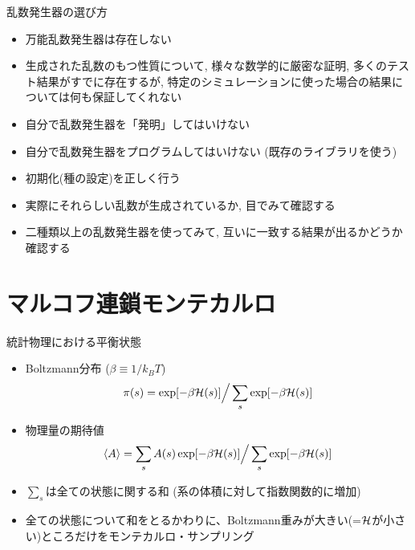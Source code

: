 \documentclass[dvipdfmx]{beamer}
\begin{document}
\begin{frame}[t,fragile]{乱数発生器の選び方}
  \begin{itemize}
  \item 万能乱数発生器は存在しない
  \item 生成された乱数のもつ性質について, 様々な数学的に厳密な証明, 多くのテスト結果がすでに存在するが, 特定のシミュレーションに使った場合の結果については何も保証してくれない
  \item 自分で乱数発生器を「発明」してはいけない
  \item 自分で乱数発生器をプログラムしてはいけない (既存のライブラリを使う)
  \item 初期化(種の設定)を正しく行う
  \item 実際にそれらしい乱数が生成されているか, 目でみて確認する
  \item 二種類以上の乱数発生器を使ってみて, 互いに一致する結果が出るかどうか確認する
  \end{itemize}
\end{frame}

\section{マルコフ連鎖モンテカルロ}

\begin{frame}[t,fragile]{統計物理における平衡状態}
  \begin{itemize}
    \setlength{\itemsep}{1em}
  \item Boltzmann分布 ($\beta \equiv 1/k_B T$)
    \[
    \pi(s) = \exp[-\beta {\cal H}(s)] \Big / \sum_s \exp[-\beta {\cal H}(s)]
    \]
  \item 物理量の期待値
    \[
    \langle A \rangle = \sum_s A(s) \exp[-\beta {\cal H}(s)] \Big/ \sum_s \exp[-\beta {\cal H}(s)]
    \]
  \item $\sum_s$は全ての状態に関する和 (系の体積に対して指数関数的に増加)
  \item 全ての状態について和をとるかわりに、Boltzmann重みが大きい(=$\cal H$が小さい)ところだけをモンテカルロ・サンプリング
  \end{itemize}
\end{frame}
\end{document}
